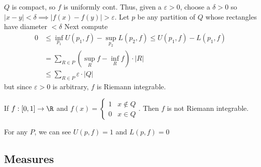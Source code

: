 \begin{solution}
	$Q$ is compact, so  $f$ is uniformly cont. Thus, given a $\varepsilon >0 $, choose a $\delta >0$ so  $|x-y| < \delta \implies |f(x) - f(y)| > \varepsilon$. Let $p$ be any partition of $Q$ whose rectangles have diameter  $< \delta$ \newline
	Next compute
	\begin{align*}
		0 &\leq \inf_{p_1} U(p_1, f) - \sup_{p_2} L(p_2, f) \leq U(p_1, f) - L(p_1, f) \\
		  &= \sum_{R \in P}^{} \left( \sup_{R} f - \inf_{R}f \right) \cdot |R| \\
		  &\leq \sum_{R \in P}^{} \varepsilon \cdot |Q|
	\end{align*}
	but since $\varepsilon > 0$ is arbitrary,  $f$ is Riemann integrable.
\end{solution}

\begin{example}
	If $f:[0,1] \to \R$ and $f(x) =
	\begin{cases}
		1 & x \notin Q \\
		0 & x \in Q
	\end{cases}$.
	Then $f$ is not Riemann integrable.
	\begin{solution}
		For any $P$, we can see  $U(p,f) = 1$ and  $L(p,f) = 0$
	\end{solution}
\end{example}

\subsection{Measures}

